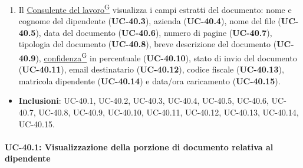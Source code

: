 ﻿\documentclass[a4paper,12pt]{article}
\providecommand{\glslink}[2]{\href{https://alittlebyte-19.github.io/Documentazione/glossario.html\#gls-#1}{\underline{#2}\textsuperscript{\scriptsize G}}}
\begin{document}
\begin{description}[style=multiline, leftmargin=4cm, font=\bfseries]
\begin{enumerate}[leftmargin=*, nosep]
        \item Il \glslink{consulente-del-lavoro-cdl}{Consulente del lavoro} visualizza i campi estratti del documento: nome e cognome del dipendente (\textbf{UC-40.3}), azienda (\textbf{UC-40.4}), nome del file (\textbf{UC-40.5}), data del documento (\textbf{UC-40.6}), numero di pagine (\textbf{UC-40.7}), tipologia del documento (\textbf{UC-40.8}), breve descrizione del documento (\textbf{UC-40.9}), \glslink{confidenza-confidence-score}{confidenza} in percentuale (\textbf{UC-40.10}), stato di invio del documento (\textbf{UC-40.11}), email destinatario (\textbf{UC-40.12}), codice fiscale (\textbf{UC-40.13}), matricola dipendente (\textbf{UC-40.14}) e data/ora caricamento (\textbf{UC-40.15}).
    \end{enumerate}
    \item[Relazioni]
    \begin{itemize}[leftmargin=*, nosep]
        \item \textbf{Inclusioni}: UC-40.1, UC-40.2, UC-40.3, UC-40.4, UC-40.5, UC-40.6, UC-40.7, UC-40.8, UC-40.9, UC-40.10, UC-40.11, UC-40.12, UC-40.13, UC-40.14, UC-40.15.
    \end{itemize}
\end{description}
\newpage

\paragraph{UC-40.1: Visualizzazione della porzione di documento relativa al dipendente}
\mbox{} \\
\end{document}
